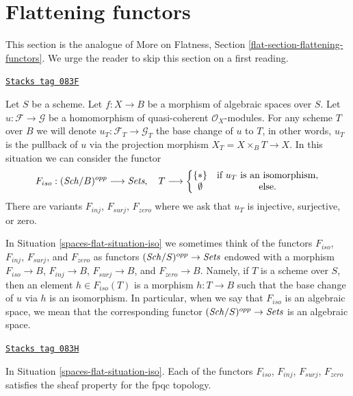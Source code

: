 \section{Flattening functors}
\label{spaces-flat-section-F-zero}
This section is the analogue of
More on Flatness, Section \ref{flat-section-flattening-functors}.
We urge the reader to skip this section on a first reading.

\begin{definition}
\label{spaces-flat-situation-iso}
\href{https://stacks.math.columbia.edu/tag/083F}{\texttt{Stacks tag 083F}}

Let $S$ be a scheme.
Let $f : X \to B$ be a morphism of algebraic spaces over $S$.
Let $u : \mathcal{F} \to \mathcal{G}$ be a homomorphism of
quasi-coherent $\mathcal{O}_X$-modules. For any scheme $T$ over
$B$ we will denote $u_T : \mathcal{F}_T \to \mathcal{G}_T$ the
base change of $u$ to $T$, in other words, $u_T$ is the pullback
of $u$ via the projection morphism $X_T = X \times_B T \to X$.
In this situation we can consider the functor
\begin{equation}
\label{equation-iso}
F_{iso} : (\mathit{Sch}/B)^{opp} \longrightarrow \textit{Sets}, \quad
T \longrightarrow \left\{
\begin{matrix}
\{*\} & \text{if }u_T\text{ is an isomorphism}, \\
\emptyset & \text{else.}
\end{matrix}
\right.
\end{equation}
There are variants $F_{inj}$, $F_{surj}$, $F_{zero}$ where we ask that
$u_T$ is injective, surjective, or zero.
\end{definition}

In Situation \ref{spaces-flat-situation-iso} we sometimes think of the functors
$F_{iso}$, $F_{inj}$, $F_{surj}$, and $F_{zero}$ as functors
$(\mathit{Sch}/S)^{opp} \to \textit{Sets}$ endowed with a morphism
$F_{iso} \to B$, $F_{inj} \to B$, $F_{surj} \to B$, and $F_{zero} \to B$.
Namely, if $T$ is a scheme over $S$, then an element $h \in F_{iso}(T)$
is a morphism $h : T \to B$
such that the base change of $u$ via $h$ is an isomorphism.
In particular, when we say
that $F_{iso}$ is an algebraic space, we mean that the corresponding
functor $(\mathit{Sch}/S)^{opp} \to \textit{Sets}$ is an algebraic space.

\begin{lemma}
\label{spaces-flat-lemma-iso-sheaf}
\href{https://stacks.math.columbia.edu/tag/083H}{\texttt{Stacks tag 083H}}

In Situation \ref{spaces-flat-situation-iso}.
Each of the functors $F_{iso}$, $F_{inj}$, $F_{surj}$, $F_{zero}$
satisfies the sheaf property for the fpqc topology.
\end{lemma}

